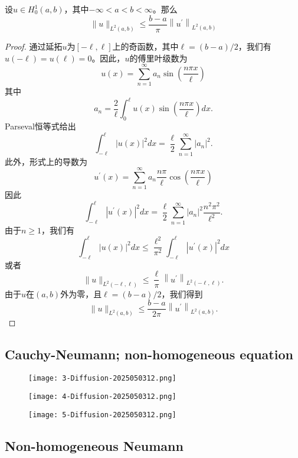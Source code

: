 \begin{theorem}[Poincaré不等式（n=1）]
设$u \in H_{0}^{1}(a, b)$，其中$-\infty<a<b<\infty$。那么
\[
\|u\|_{L^{2}(a, b)} \leq \frac{b-a}{\pi}\left\|u^{\prime}\right\|_{L^{2}(a, b)}
\]
\end{theorem}
\begin{proof}
通过延拓$u$为$[-\ell, \ell]$上的奇函数，其中$\ell = (b-a)/2$，我们有$u(-\ell)=u(\ell)=0$。因此，$u$的傅里叶级数为
\[
u(x)=\sum_{n=1}^{\infty} a_{n} \sin \left(\frac{n \pi x}{\ell}\right)
\]
其中
\[
a_{n}=\frac{2}{\ell} \int_{0}^{\ell} u(x) \sin \left(\frac{n \pi x}{\ell}\right) d x .
\]
Parseval恒等式给出
\[
\int_{-\ell}^{\ell}|u(x)|^{2} d x=\frac{\ell}{2} \sum_{n=1}^{\infty}\left|a_{n}\right|^{2} .
\]
此外，形式上的导数为
\[
u^{\prime}(x)=\sum_{n=1}^{\infty} a_{n} \frac{n \pi}{\ell} \cos \left(\frac{n \pi x}{\ell}\right)
\]
因此
\[
\int_{-\ell}^{\ell}\left|u^{\prime}(x)\right|^{2} d x=\frac{\ell}{2} \sum_{n=1}^{\infty}\left|a_{n}\right|^{2} \frac{n^{2} \pi^{2}}{\ell^{2}} .
\]
由于$n \geq 1$，我们有
\[
\int_{-\ell}^{\ell}|u(x)|^{2} d x \leq \frac{\ell^{2}}{\pi^{2}} \int_{-\ell}^{\ell}\left|u^{\prime}(x)\right|^{2} d x
\]
或者
\[
\|u\|_{L^{2}(-\ell, \ell)} \leq \frac{\ell}{\pi}\left\|u^{\prime}\right\|_{L^{2}(-\ell, \ell)} .
\]
由于$u$在$(a,b)$外为零，且$\ell = (b-a)/2$，我们得到
\[
\|u\|_{L^{2}(a, b)} \leq \frac{b-a}{2 \pi}\left\|u^{\prime}\right\|_{L^{2}(a, b)} .
\]
\end{proof}

\subsection{Cauchy-Neumann; non-homogeneous equation}

\begin{figure}[H]
\centering
\texttt{[image: 3-Diffusion-2025050312.png]}
\label{}
\end{figure}
\begin{figure}[H]
\centering
\texttt{[image: 4-Diffusion-2025050312.png]}
\label{}
\end{figure}

\begin{figure}[H]
\centering
\texttt{[image: 5-Diffusion-2025050312.png]}
\label{}
\end{figure}

\subsection{Non-homogeneous Neumann}

